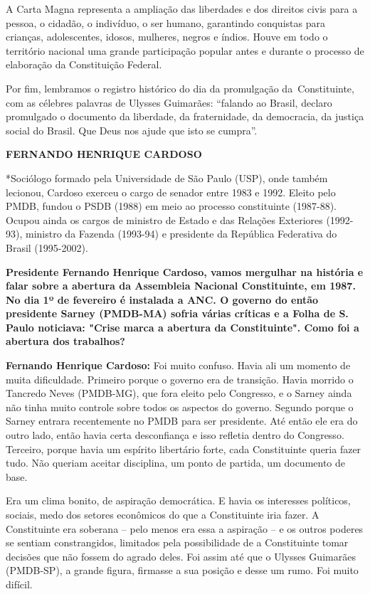 A Carta Magna representa a ampliação das liberdades e dos direitos civis
para a pessoa, o cidadão, o indivíduo, o ser humano, garantindo
conquistas para crianças, adolescentes, idosos, mulheres, negros e
índios. Houve em todo o território nacional uma grande participação
popular antes e durante o processo de elaboração da Constituição
Federal.

Por fim, lembramos o registro histórico do dia da promulgação
da~Constituinte, com as célebres palavras de Ulysses Guimarães:
``falando ao Brasil, declaro promulgado o documento da liberdade, da
fraternidade, da democracia, da justiça social do Brasil. Que Deus nos
ajude que isto se cumpra''.

\textbf{FERNANDO HENRIQUE CARDOSO}

*Sociólogo formado pela Universidade de São Paulo (USP), onde também
lecionou, Cardoso exerceu o cargo de senador entre 1983 e 1992. Eleito
pelo PMDB, fundou o PSDB (1988) em meio ao processo constituinte
(1987-88). Ocupou ainda os cargos de ministro de Estado e das Relações
Exteriores (1992-93), ministro da Fazenda (1993-94) e presidente da
República Federativa do Brasil (1995-2002).

\textbf{Presidente Fernando Henrique Cardoso, vamos mergulhar na
história e falar sobre a abertura da Assembleia Nacional Constituinte,
em 1987. No dia 1º de fevereiro é instalada a ANC. O governo do então
presidente Sarney (PMDB-MA) sofria várias críticas e a Folha de S. Paulo
noticiava: "Crise marca a abertura da Constituinte". Como foi a abertura
dos trabalhos?}

\textbf{Fernando Henrique Cardoso:} Foi muito confuso. Havia ali um
momento de muita dificuldade. Primeiro porque o governo era de
transição. Havia morrido o Tancredo Neves (PMDB-MG), que fora eleito
pelo Congresso, e o Sarney ainda não tinha muito controle sobre todos os
aspectos do governo. Segundo porque o Sarney entrara recentemente no
PMDB para ser presidente. Até então ele era do outro lado, então havia
certa desconfiança e isso refletia dentro do Congresso. Terceiro, porque
havia um espírito libertário forte, cada Constituinte queria fazer tudo.
Não queriam aceitar disciplina, um ponto de partida, um documento de
base.

Era um clima bonito, de aspiração democrática. E havia os interesses
políticos, sociais, medo dos setores econômicos do que a Constituinte
iria fazer. A Constituinte era soberana -- pelo menos era essa a
aspiração -- e os outros poderes se sentiam constrangidos, limitados
pela possibilidade de a Constituinte tomar decisões que não fossem do
agrado deles. Foi assim até que o Ulysses Guimarães (PMDB-SP), a grande
figura, firmasse a sua posição e desse um rumo. Foi muito difícil.

